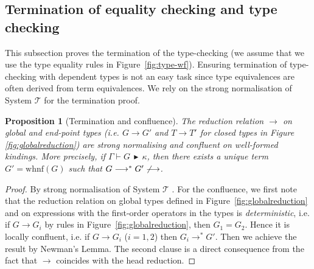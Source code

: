 \documentclass{LMCS}
\newcommand{\redsym}{\ensuremath{\longrightarrow}}
\newcommand{\G}{\ensuremath{G}}
\newcommand{\T}{\ensuremath{T}}
\newcommand{\K}{\ensuremath{\kappa}}
\newcommand{\RHD}{\,\ensuremath{\blacktriangleright}\,}
\newtheorem{PROP}[DUM]{Proposition}{}{}
\newcommand{\proves}{\vdash}                        \newcommand{\judg}{{J}}
\newcommand{\WHNF}[1]{\ensuremath{\text{whnf}(#1)}}
\begin{document}
\label{sec:subjectreduction}
\subsection{Termination of equality checking and type checking} 
\label{subsec:termination}
This subsection proves the termination of the type-checking 
(we assume that we use the type equality rules in Figure~\ref{fig:type-wf}).  
\noindent Ensuring termination of type-checking with dependent types is not an
easy task since type equivalences are often derived from term equivalences.  We
rely on the strong normalisation of System $\mathcal{T}$
\cite{GirardJY:protyp} for the termination proof.
 
\begin{PROP}[Termination and confluence]
\label{prop:SNconfluent}
The reduction relation $\redsym$ on global and end-point types 
(i.e. $\G\redsym \G'$
and $\T\redsym \T'$ for closed types in Figure \ref{fig:globalreduction}) 
are strong normalising and confluent on well-formed kindings. 
More precisely, 
if $\Gamma\proves G \RHD \K$, then there exists a unique term 
$G'= \WHNF{G}$ such that $G \redsym^\ast G'\not\redsym$. 
\end{PROP}
\begin{proof}
By strong normalisation of System $\mathcal{T}$ \cite{GirardJY:protyp}. 
For the confluence, we first note that the reduction relation on 
global types defined in Figure~\ref{fig:globalreduction} 
and on expressions with the first-order operators in the types 
is {\em deterministic}, i.e. if $\G\redsym \G_i$  
by rules in Figure~\ref{fig:globalreduction}, then $\G_1=\G_2$. 
Hence it is locally confluent, i.e. if  $\G\redsym \G_i$ ($i=1,2$) then 
$\G_i\redsym^\ast \G'$. Then we achieve the result
by Newman's Lemma. The second clause is a direct consequence 
from the fact that $\redsym$ coincides with the head reduction.
\end{proof}
\end{document}
